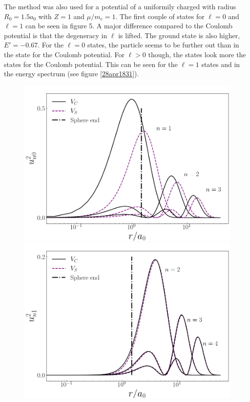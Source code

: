 \documentclass[twocolumn]{article}
\begin{document}
\begin{large}
The method was also used for a potential of a uniformily charged with radius $R_0=1.5a_0$ with $Z=1$ and $\mu/m_e=1$. The first couple of states for $\ell=0$ and $\ell=1$ can be seen in figure 5. A major difference compared to the Coulomb potential is that the degeneracy in $\ell$ is lifted. The ground state is also higher, $E'=-0.67$. For the $\ell=0$ states, the particle seems to be further out than in the state for the Coulomb potential. For $\ell>0$ though, the states look more the states for the Coulomb potential. This can be seen for the $\ell=1$ states and in the energy spectrum (see figure \ref{28apr1831}).
\begin{figure}[h]
    \includegraphics[scale=0.35]{sphere_l0.png}
    \label{28apr1828}
    \includegraphics[scale=0.35]{sphere_l1.png}  

\end{figure}
\end{large}
\end{document}
